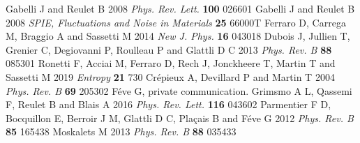 \documentclass[12pt]{iopart}
\begin{document}
\begin{thebibliography}{999}
%
 Gabelli J and Reulet B 2008 \emph{Phys. Rev. Lett.} \textbf{100} 026601
%
 Gabelli J and Reulet B 2008 \emph{SPIE, Fluctuations and Noise in Materials} \textbf{25} 66000T
%
 Ferraro D, Carrega M, Braggio A and Sassetti M 2014 \emph{New J. Phys.} \textbf{16} 043018
%
 Dubois J, Jullien T, Grenier C, Degiovanni P, Roulleau P and Glattli D C 2013 \emph{Phys. Rev. B} \textbf{88} 085301
%
 Ronetti F, Acciai M, Ferraro D, Rech J, Jonckheere T, Martin T and Sassetti M 2019
\emph{Entropy} \textbf{21} 730
%
 Cr\'epieux A, Devillard P and  Martin T 2004 \emph{Phys. Rev. B} \textbf{69} 205302
%
 F\'eve G, private communication. 
%
 Grimsmo A L, Qassemi F, Reulet B and Blais A 2016 \emph{Phys. Rev. Lett.} \textbf{116} 043602
%
 Parmentier F D, Bocquillon E, Berroir J M, Glattli D C, Plaçais B and F\'eve G 2012 \emph{Phys. Rev. B} \textbf{85} 165438
%
 Moskalets M 2013 \emph{Phys. Rev. B} \textbf{88} 035433
%
\end{thebibliography}
\end{document}

